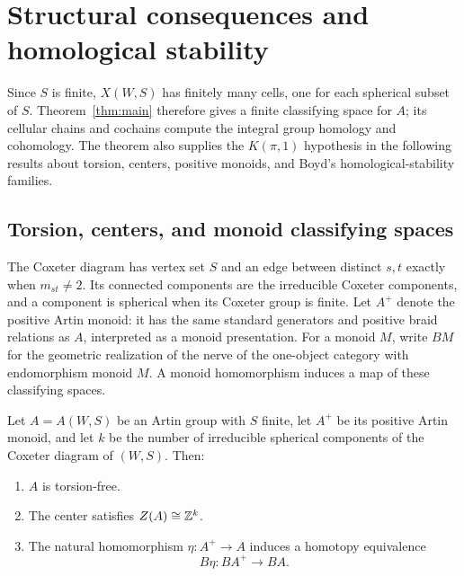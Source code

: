 \section{Structural consequences and homological stability}
\label{sec:consequences}

Since \(S\) is finite, \(X(W,S)\) has finitely many cells, one for each
spherical subset of \(S\).  Theorem~\ref{thm:main} therefore gives a finite
classifying space for \(A\); its cellular chains and cochains compute the
integral group homology and cohomology.  The theorem also supplies the
\(K(\pi,1)\) hypothesis in the following results about torsion, centers,
positive monoids, and Boyd's homological-stability families.

\subsection{Torsion, centers, and monoid classifying spaces}

The Coxeter diagram has vertex set \(S\) and an edge between distinct
\(s,t\) exactly when \(m_{st}\ne2\).  Its connected components are the
irreducible Coxeter components, and a component is spherical when its
Coxeter group is finite.  Let \(A^+\) denote the positive Artin monoid:
it has the same standard generators and positive braid relations as
\(A\), interpreted as a monoid presentation.  For a monoid \(M\), write
\(BM\) for the geometric realization of the nerve of the one-object
category with endomorphism monoid \(M\).  A monoid homomorphism induces
a map of these classifying spaces.

\begin{corollary}
\label{cor:artin-structural}
Let \(A=A(W,S)\) be an Artin group with \(S\) finite, let \(A^+\) be its
positive Artin monoid, and let \(k\) be the number of irreducible
spherical components of the Coxeter diagram of \((W,S)\).  Then:
\begin{enumerate}[label=\textup{(\roman*)}]
  \item \(A\) is torsion-free.
  \item The center satisfies \(Z(A)\cong\mathbb Z^k\).
  \item The natural homomorphism \(\eta\colon A^+\to A\) induces a
    homotopy equivalence
    \[
      B\eta\colon BA^+\longrightarrow BA.
    \]
\end{enumerate}
\end{corollary}

